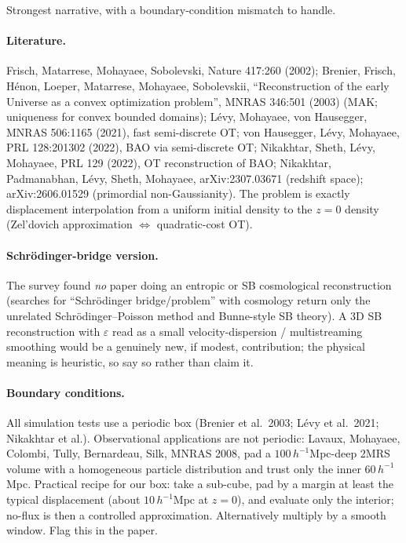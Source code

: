 \documentclass[11pt]{article}
\newcommand{\eps}{\varepsilon}
\begin{document}
Strongest narrative, with a boundary-condition mismatch to handle.

\paragraph{Literature.} Frisch, Matarrese, Mohayaee, Sobolevski, Nature 417:260
(2002); Brenier, Frisch, H\'enon, Loeper, Matarrese, Mohayaee, Sobolevskii,
``Reconstruction of the early Universe as a convex optimization problem'', MNRAS
346:501 (2003) (MAK; uniqueness for convex bounded domains); L\'evy, Mohayaee, von
Hausegger, MNRAS 506:1165 (2021), fast semi-discrete OT; von Hausegger, L\'evy,
Mohayaee, PRL 128:201302 (2022), BAO via semi-discrete OT; Nikakhtar, Sheth, L\'evy,
Mohayaee, PRL 129 (2022), OT reconstruction of BAO; Nikakhtar, Padmanabhan, L\'evy,
Sheth, Mohayaee, arXiv:2307.03671 (redshift space); arXiv:2606.01529 (primordial
non-Gaussianity). The problem is exactly displacement interpolation from a uniform
initial density to the $z=0$ density (Zel'dovich approximation $\Leftrightarrow$
quadratic-cost OT).

\paragraph{Schr\"odinger-bridge version.} The survey found \emph{no} paper doing an
entropic or SB cosmological reconstruction (searches for ``Schr\"odinger
bridge/problem'' with cosmology return only the unrelated Schr\"odinger--Poisson
method and Bunne-style SB theory). A 3D SB reconstruction with $\eps$ read as a small
velocity-dispersion / multistreaming smoothing would be a genuinely new, if modest,
contribution; the physical meaning is heuristic, so say so rather than claim it.

\paragraph{Boundary conditions.} All simulation tests use a periodic box (Brenier et
al.\ 2003; L\'evy et al.\ 2021; Nikakhtar et al.). Observational applications are
not periodic: Lavaux, Mohayaee, Colombi, Tully, Bernardeau, Silk, MNRAS 2008, pad a
$100\,h^{-1}$Mpc-deep 2MRS volume with a homogeneous particle distribution and trust
only the inner $60\,h^{-1}$Mpc. Practical recipe for our box: take a sub-cube, pad by
a margin at least the typical displacement (about $10\,h^{-1}$Mpc at $z=0$), and
evaluate only the interior; no-flux is then a controlled approximation.
Alternatively multiply by a smooth window. Flag this in the paper.
\end{document}

